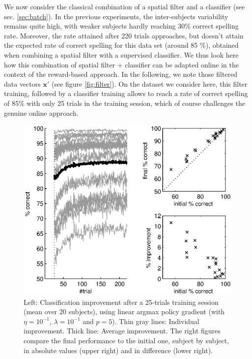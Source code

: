 \documentclass[conference]{IEEEtran}
\begin{document}
We now consider the classical combination of a spatial filter and a classifier (see sec. \ref{sec:batch}). %
In the previous experiments, the inter-subjects variability remains quite high, 
with weaker subjects hardly reaching 30\% correct spelling rate.
Moreover, the rate attained after 220 trials approaches, but doesn't attain the expected rate of correct spelling
for this data set (around 85 \%), obtained when combining a spatial filter with a
supervised classifier. 
We thus look here how this combination of spatial filter + classifier can be adapted
online in the context of the reward-based approach.
In the following, we note those 
filtered data vectors $\boldsymbol{x}'$ (see figure \ref{fig:filter}).
On the dataset we consider here, this filter training, followed by a classifier training 
allows to reach a rate of correct spelling of 85\% with only 25 trials in the 
training session, which of course challenges the genuine online approach.


\begin{figure}
\centerline{
 \includegraphics[width=\linewidth]{figs-copie/fig_filter_adapt}
}
\caption{Left: Classification improvement after a 25-trials training session (mean over 20 subjects), 
using linear argmax policy gradient (with $\eta = 10^{-1}$, $\lambda = 10^{-1}$ and $p=5$). 
Thin gray lines: Individual improvement. Thick line: Average improvement. The right figures compare the 
final performance to the initial one, subject by subject, in absolute values (upper right) and in
difference (lower right).}
\label{fig:filter_adapt}
\end{figure}
\end{document}
